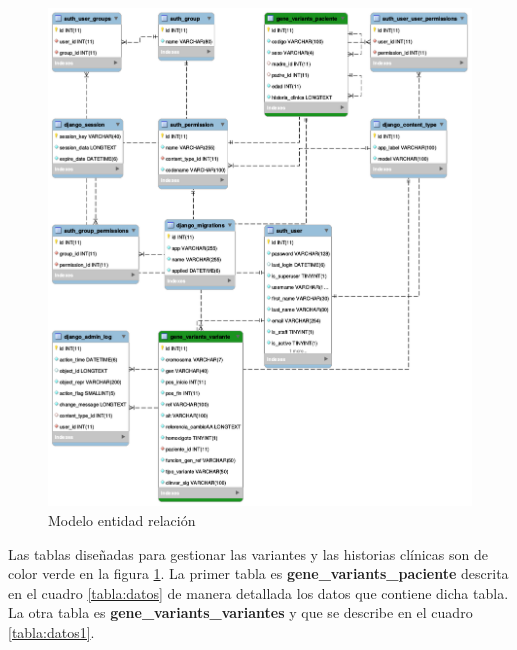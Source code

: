 \begin{figure}[]
	\centering
	\includegraphics[width=1\textwidth]{Kap3/EER}
	\caption{Modelo entidad relación} \label{fig:t}
\end{figure}

Las tablas diseñadas para gestionar las variantes y las historias clínicas son de color verde en la figura \ref{fig:t}. La primer tabla es \textbf{gene\_variants\_paciente} descrita en el  cuadro \ref{tabla:datos} de manera detallada los datos que contiene dicha tabla. La otra tabla es \textbf{gene\_variants\_variantes} y que se describe en el cuadro \ref{tabla:datos1}. 

